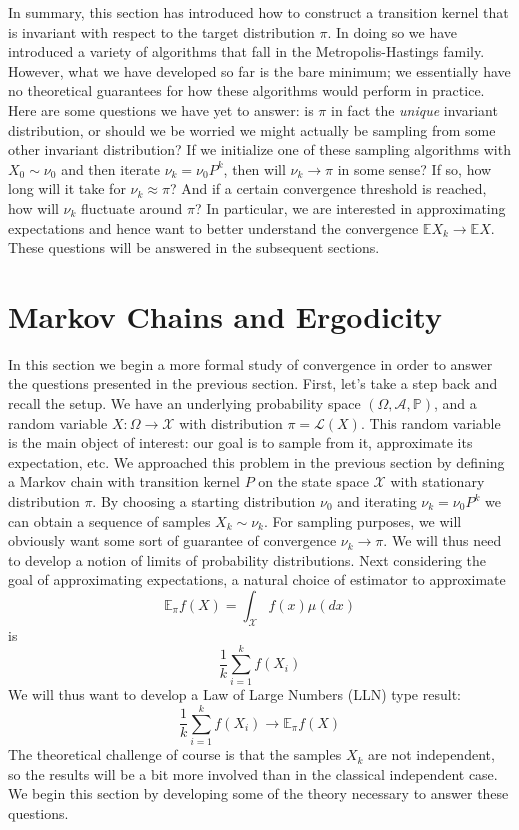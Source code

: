 \documentclass[12pt]{article}
\newcommand{\E}{\mathbb{E}}
\newcommand{\Prob}{\mathbb{P}}
\begin{document}
In summary, this section has introduced how to construct a transition kernel that is invariant with respect to the target distribution $\pi$. In doing so we have introduced 
a variety of algorithms that fall in the Metropolis-Hastings family. However, what we have developed so far is the bare minimum; we essentially have no theoretical guarantees
for how these algorithms would perform in practice. Here are some questions we have yet to answer: is $\pi$ in fact the \textit{unique} invariant distribution, or should we be worried
we might actually be sampling from some other invariant distribution? If we initialize one of these sampling algorithms with $X_0 \sim \nu_0$ and then iterate 
$\nu_{k} = \nu_0 P^k$, then will $\nu_k \to \pi$ in some sense? If so, how long will it take for $\nu_k \approx \pi$? And if a certain convergence threshold is reached, how will 
$\nu_k$ fluctuate around $\pi$? In particular, we are interested in approximating expectations and hence want to better understand the convergence
$\E X_k \to \E X$. These questions will be answered in the subsequent sections. 

\section{Markov Chains and Ergodicity}
In this section we begin a more formal study of convergence in order to answer the questions presented in the previous section. First, let's take a step 
back and recall the setup. We have an underlying probability space $(\Omega, \mathcal{A}, \Prob)$, and a random variable $X: \Omega \to \mathcal{X}$
with distribution $\pi = \mathcal{L}(X)$. This random variable is the main object of interest: our goal is to sample from it, approximate its expectation, 
etc. We approached this problem in the previous section by defining a Markov chain with transition kernel $P$ on the state space $\mathcal{X}$ with stationary distribution 
$\pi$. By choosing a starting distribution $\nu_0$ and iterating $\nu_k = \nu_0 P^k$ we can obtain a sequence of samples $X_k \sim \nu_k$. For sampling purposes, 
we will obviously want some sort of guarantee of convergence $\nu_k \to \pi$. We will thus need to develop a notion of limits of probability distributions. 
Next considering the goal of 
approximating expectations, a natural choice of estimator to approximate
\[\E_\pi f(X) = \int_{\mathcal{X}} f(x) \mu(dx)\]
is 
\[\frac{1}{k} \sum_{i = 1}^{k} f(X_i)\]
We will thus want to develop a Law of Large Numbers (LLN) type result: 
\[\frac{1}{k} \sum_{i = 1}^{k} f(X_i) \to \E_\pi f(X)\]
The theoretical challenge of course is that the samples $X_k$ are not independent, so the results will be a bit more involved than in the classical independent 
case. We begin this section by developing some of the theory necessary to answer these questions. 
\end{document}
